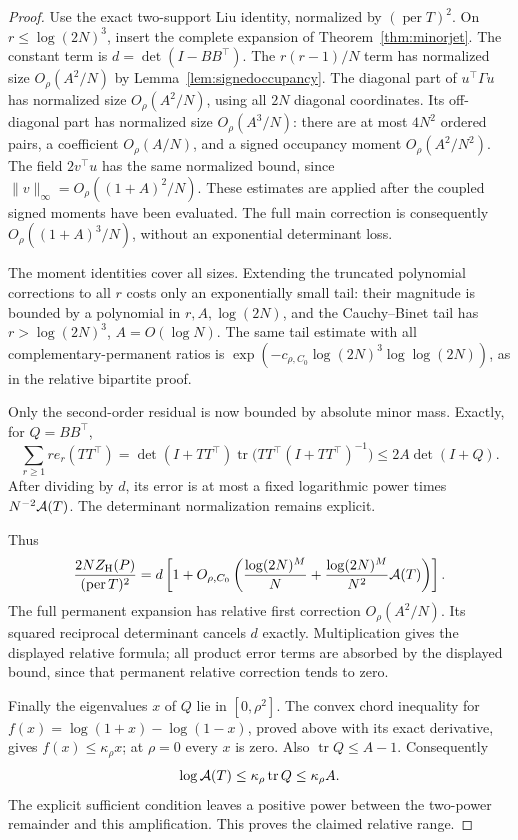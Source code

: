 \begin{proof}
Use the exact two-support Liu identity, normalized by
\((\operatorname{per}T)^2\).
On \(r\leq\log(2N)^3\), insert the complete expansion of
Theorem~\ref{thm:minorjet}.
The constant term is \(d=\det(I-BB^\top)\).
The \(r(r-1)/N\) term has normalized size \(O_\rho(A^2/N)\)
by Lemma~\ref{lem:signedoccupancy}.
The diagonal part of \(u^\top\Gamma u\) has normalized
size \(O_\rho(A^2/N)\), using all \(2N\) diagonal coordinates.
Its off-diagonal part has normalized size \(O_\rho(A^3/N)\):
there are at most \(4N^2\) ordered pairs, a coefficient
\(O_\rho(A/N)\), and a signed occupancy moment
\(O_\rho(A^2/N^2)\).
The field \(2v^\top u\) has the same normalized bound,
since \(\|v\|_\infty=O_\rho((1+A)^2/N)\).
These estimates are applied after the coupled signed moments
have been evaluated. The full main correction is consequently
\(O_\rho((1+A)^3/N)\), without an exponential determinant loss.

The moment identities cover all sizes.
Extending the truncated polynomial corrections to all \(r\)
costs only an exponentially small tail: their magnitude is
bounded by a polynomial in \(r,A,\log(2N)\), and the
Cauchy--Binet tail has \(r>\log(2N)^3\), \(A=O(\log N)\).
The same tail estimate with all complementary-permanent
ratios is
\(\exp(-c_{\rho,C_0}\log(2N)^3\log\log(2N))\),
as in the relative bipartite proof.

Only the second-order residual is now bounded by absolute
minor mass. Exactly, for \(Q=BB^\top\),
\[
 \sum_{r\geq1}r e_r(TT^\top)
 =\det(I+TT^\top)
       \operatorname{tr}\bigl(TT^\top(I+TT^\top)^{-1}\bigr)
 \leq2A\det(I+Q).
\]
After dividing by \(d\), its error is at most a fixed
logarithmic power times \(N^{-2}{\cal A}(T)\).
The determinant normalization remains explicit.

Thus
\[
 \frac{2N Z_{\rm H}(P)}{(\operatorname{per}T)^2}
 =d\left[1+O_{\rho,C_0}\left(
       \frac{\log(2N)^M}{N}
       +\frac{\log(2N)^M}{N^2}{\cal A}(T)\right)\right].
\]
The full permanent expansion has relative first correction
\(O_\rho(A^2/N)\).
Its squared reciprocal determinant cancels \(d\) exactly.
Multiplication gives the displayed relative formula; all product error terms are
absorbed by the displayed bound, since that permanent
relative correction tends to zero.

Finally the eigenvalues \(x\) of \(Q\) lie in \([0,\rho^2]\).
The convex chord inequality for
\(f(x)=\log(1+x)-\log(1-x)\), proved above with its exact derivative,
gives \(f(x)\leq\kappa_\rho x\); at \(\rho=0\) every \(x\) is zero.
Also \(\operatorname{tr}Q\leq A-1\).
Consequently
\[
 \log{\cal A}(T)\leq\kappa_\rho\operatorname{tr}Q
                                      \leq\kappa_\rho A.
\]
The explicit sufficient condition leaves a positive power
between the two-power remainder and this amplification.
This proves the claimed relative range.
\end{proof}


